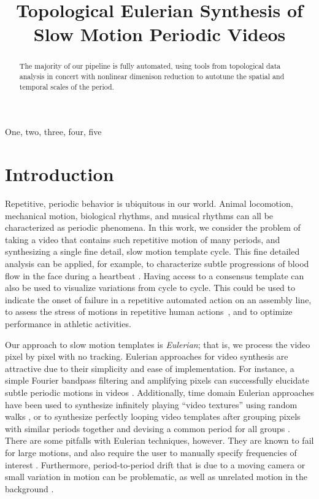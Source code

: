 \documentclass{article}
\title{Topological Eulerian Synthesis of Slow Motion Periodic Videos}
\begin{document}
%
\maketitle
%


\begin{abstract}

The majority of our pipeline is fully automated, using tools from topological data analysis in concert with nonlinear dimenison reduction to autotune the spatial and temporal scales of the period.

\end{abstract}
%
\begin{keywords}
One, two, three, four, five
\end{keywords}
%


\section{Introduction}

Repetitive, periodic behavior is ubiquitous in our world. Animal locomotion, mechanical motion, biological rhythms, and musical rhythms can all be characterized as periodic phenomena.  In this work, we consider the problem of taking a video that contains such repetitive motion of many periods, and synthesizing a single fine detail, slow motion template cycle.  This fine detailed analysis can be applied, for example, to characterize subtle progressions of blood flow in the face during a heartbeat \cite{kumar2015distanceppg}.  Having access to a consensus template can also be used to visualize variations from cycle to cycle. This could be used to indicate the onset of failure in a repetitive automated action on an assembly line, to assess the stress of motions in repetitive human actions~\cite{greene2017visualizing}, and to optimize performance in athletic activities.

Our approach to slow motion templates is {\em Eulerian}; that is, we process the video pixel by pixel with no tracking.  Eulerian approaches for video synthesis are attractive due to their simplicity and ease of implementation.  For instance, a simple Fourier bandpass filtering and amplifying pixels can successfully elucidate subtle periodic motions in videos \cite{wu2012eulerian, wadhwa2013phase}.  Additionally, time domain Eulerian approaches have been used to synthesize infinitely playing ``video textures'' using random walks \cite{schodl2000video}, or to synthesize perfectly looping video templates after grouping pixels with similar periods together and devising a common period for all groups \cite{Liao2013VideoLoops,Liao2015VideoLoops}.  There are some pitfalls with Eulerian techniques, however.  They are known to fail for large motions, and also require the user to manually specify frequencies of interest \cite{wu2012eulerian, wadhwa2013phase}.  Furthermore, period-to-period drift that is due to a moving camera or small variation in motion can be problematic, as well as unrelated motion in the background \cite{stauffer1999adaptive}.
\end{document}
